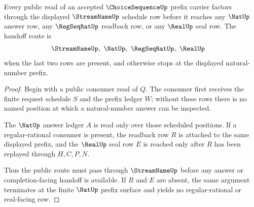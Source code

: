 \begin{theorem}
\label{thm:choice-sequence-streamname-handoff}
Every public read of an accepted $\ChoiceSequenceUp$ prefix carrier factors through the displayed $\StreamNameUp$ schedule row before it reaches any $\NatUp$ answer row, any $\RegSeqRatUp$ readback row, or any $\RealUp$ seal row. The handoff route is
$$
\StreamNameUp,\ \NatUp,\ \RegSeqRatUp,\ \RealUp
$$
when the last two rows are present, and otherwise stops at the displayed natural-number prefix.
\end{theorem}
\begin{proof}
Begin with a public consumer read of $Q$. The consumer first receives the finite request schedule $S$ and the prefix ledger $W$; without these rows there is no named position at which a natural-number answer can be inspected.

The $\NatUp$ answer ledger $A$ is read only over those scheduled positions. If a regular-rational consumer is present, the readback row $R$ is attached to the same displayed prefix, and the $\RealUp$ seal row $E$ is reached only after $R$ has been replayed through $H,C,P,N$.

Thus the public route must pass through $\StreamNameUp$ before any answer or completion-facing handoff is available. If $R$ and $E$ are absent, the same argument terminates at the finite $\NatUp$ prefix surface and yields no regular-rational or real-facing row.
\end{proof}

